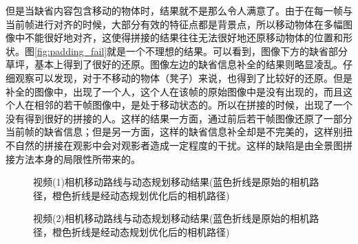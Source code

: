 \documentclass[journal, a4paper]{IEEEtran}
\begin{document}
    但是当缺省内容包含移动的物体时，结果就不是那么令人满意了。由于在每一帧与当前帧进行对齐的时候，大部分有效的特征点都是背景点，所以移动物体在多幅图像中不能很好地对齐，这使得拼接的结果往往无法很好地还原移动物体的位置和形状。图\ref{fig:padding_fail}就是一个不理想的结果。可以看到，图像下方的缺省部分草坪，基本上得到了很好的还原。图像左边的缺省信息补全的结果则略显凌乱。仔细观察可以发现，对于不移动的物体（凳子）来说，也得到了比较好的还原。但是补全的图像中，出现了一个人，这个人在该帧的原始图像中是没有出现的，而且这个人在相邻的若干帧图像中，是处于移动状态的。所以在拼接的时候，出现了一个没有得到很好的拼接的人。这样的结果一方面，通过前后若干帧图像还原了一部分当前帧的缺省信息；但是另一方面，这样的缺省信息补全却是不完美的，这样别扭不自然的拼接在观影中会对观影者造成一定程度的干扰。这样的缺陷是由全景图拼接方法本身的局限性所带来的。\\
    \begin{figure*}[!t]
      \begin{center}
          \caption{视频(1)相机移动路线与动态规划移动结果(蓝色折线是原始的相机路径，橙色折线是经动态规划优化后的相机路径)}
          \label{fig:DP_motion_c}
      \end{center}
    \end{figure*}
    \begin{figure*}[!t]
      \begin{center}
          \caption{视频(2)相机移动路线与动态规划移动结果(蓝色折线是原始的相机路径，橙色折线是经动态规划优化后的相机路径)}
          \label{fig:DP_motion_a}
      \end{center}
    \end{figure*}
\end{document}
